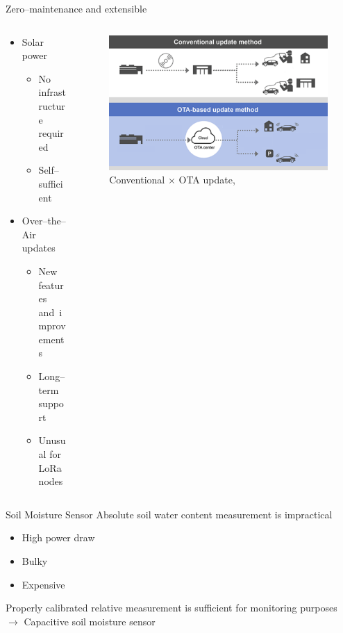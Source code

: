 \documentclass[hyphens]{beamer}
\begin{document}
\begin{frame}{Zero--maintenance and extensible}
\begin{columns}[T]
\begin{column}{.4\textwidth}
    \begin{itemize}
        \item Solar power
        \begin{itemize}
            \item No infrastructure required
            \item Self--sufficient
        \end{itemize}
        \item Over--the--Air updates
        \begin{itemize}
            \item New features and~improvements
            \item Long--term support
            \item Unusual for LoRa nodes
        \end{itemize}
    \end{itemize}
\end{column}
\hfil
\begin{column}{.6\textwidth}
    \begin{figure}
        \centering
        \includegraphics[width=\linewidth]{img/ota-popular.png}
        \caption*{Conventional $\times$ OTA update, \cite{mobility_connected_what_2024}}
    \end{figure}
\end{column}
\end{columns}
\end{frame}


\begin{frame}{Soil Moisture Sensor}
Absolute soil water content measurement is impractical
\begin{itemize}
    \item High power draw
    \item Bulky
    \item Expensive
\end{itemize}
\vspace{1em}
Properly calibrated relative measurement is sufficient for monitoring purposes\\
\vspace{1em}
$\to$ Capacitive soil moisture sensor
\end{frame}
\end{document}
